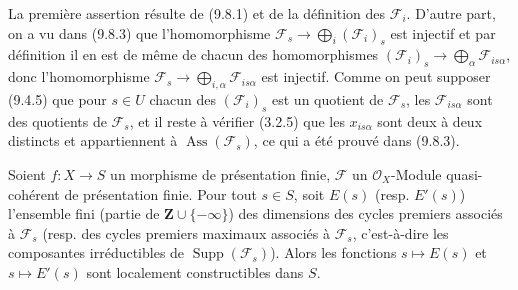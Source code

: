 La première assertion résulte de (9.8.1) et de la définition des
$\mathcal F_i$. D'autre part, on a vu dans (9.8.3) que l'homomorphisme
$\mathcal F_s\to\bigoplus_i(\mathcal F_i)_s$ est injectif et par définition il
en est de même de chacun des homomorphismes
$(\mathcal F_i)_s\to\bigoplus_\alpha\mathcal F_{is\alpha}$, donc
l'homomorphisme $\mathcal F_s\to\bigoplus_{i,\alpha}\mathcal F_{is\alpha}$ est
injectif. Comme on peut supposer (9.4.5) que pour $s\in U$ chacun des
$(\mathcal F_i)_s$ est un quotient de $\mathcal F_s$, les
$\mathcal F_{is\alpha}$ sont des quotients de $\mathcal F_s$, et il reste à
vérifier (3.2.5) que les $x_{is\alpha}$ sont deux à deux distincts et
appartiennent à $\operatorname{Ass}(\mathcal F_s)$, ce qui a été prouvé dans
(9.8.3).

\begin{proposition}[9.8.5]
\label{IV.9.8.5-fr}
Soient $f:X\to S$ un morphisme de présentation finie, $\mathcal F$ un
$\mathcal O_X$-Module quasi-cohérent de présentation finie. Pour tout $s\in S$,
soit $E(s)$ (resp. $E'(s)$) l'ensemble fini (partie de
$\mathbf Z\cup\{-\infty\}$) des dimensions des cycles premiers associés à
$\mathcal F_s$ (resp. des cycles premiers maximaux associés à $\mathcal F_s$,
c'est-à-dire les composantes irréductibles de $\operatorname{Supp}(\mathcal F_s)$).
Alors les fonctions $s\mapsto E(s)$ et $s\mapsto E'(s)$ sont localement
constructibles dans $S$.
\end{proposition}


